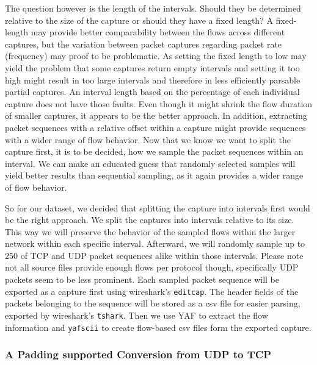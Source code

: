 \documentclass[
	ngerman,
	ruledheaders=section,%
	class=report,%
	thesis={type=bachelor},%
	accentcolor=9c,%
	custommargins=true,%
	marginpar=false,%
	parskip=half-,%
	fontsize=11pt,%
]{tudapub}
\let\code\texttt
\begin{document}
The question however is the length of the intervals.
Should they be determined relative to the size of the capture or should they have a fixed length?
A fixed-length may provide better comparability between the flows across different captures,
but the variation between packet captures regarding packet rate (frequency) may proof to be problematic.
As setting the fixed length to low may yield the problem that some captures return empty intervals
and setting it too high might result in too large intervals and therefore in less efficiently parsable partial captures.
An interval length based on the percentage of each individual capture does not have those faults.
Even though it might shrink the flow duration of smaller captures, it appears to be the better approach.
In addition, extracting packet sequences with a relative offset within a capture might provide sequences with a wider range of flow behavior.
Now that we know we want to split the capture first, it is to be decided, how we sample the packet sequences within an interval.
We can make an educated guess that randomly selected samples will yield better results than sequential sampling, as it again provides a wider range of flow behavior.

So for our dataset, we decided that splitting the capture into intervals first would be the right approach.
We split the captures into intervals relative to its size.
This way we will preserve the behavior of the sampled flows within the larger network within each specific interval.
Afterward, we will randomly sample up to 250 of TCP and UDP packet sequences alike within those intervals.
Please note not all source files provide enough flows per protocol though, specifically UDP packets seem to be less prominent.
Each sampled packet sequence will be exported as a capture first using wireshark's \code{editcap}.
The header fields of the packets belonging to the sequence will be stored as a csv file for easier parsing, exported by wireshark's \code{tshark}.
Then we use YAF to extract the flow information and \code{yafscii} to create flow-based csv files form the exported capture.

\subsubsection{A Padding supported Conversion from UDP to TCP}
\label{sec:UDPpadding}
\end{document}
